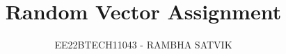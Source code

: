 \documentclass[journal,12pt,onecolumn]{IEEEtran}
\theoremstyle{remark}
\begin{document}
%




\vspace{3cm}

\title{
Random Vector Assignment
}
\author{ EE22BTECH11043 - RAMBHA SATVIK %
  
}  


%
%
%
% 
%



% 
\end{document}
